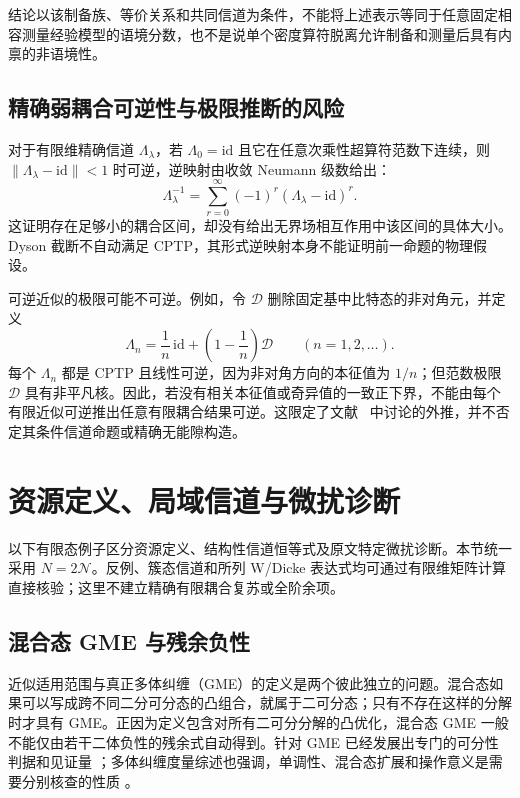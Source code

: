 \documentclass[UTF8,11pt,a4paper,fontset=none]{ctexart}
\begin{document}
结论以该制备族、等价关系和共同信道为条件，不能将上述表示等同于任意固定相容测量经验模型的语境分数，也不是说单个密度算符脱离允许制备和测量后具有内禀的非语境性。

\subsection{精确弱耦合可逆性与极限推断的风险}
对于有限维精确信道 $\Lambda_\lambda$，若 $\Lambda_0=\mathrm{id}$ 且它在任意次乘性超算符范数下连续，则 $\|\Lambda_\lambda-\mathrm{id}\|<1$ 时可逆，逆映射由收敛 Neumann 级数给出：
\begin{equation}
\Lambda_\lambda^{-1}=\sum_{r=0}^{\infty}
(-1)^r(\Lambda_\lambda-\mathrm{id})^r.
\label{eq:supp-neumann-channel-inverse}
\end{equation}
这证明存在足够小的耦合区间，却没有给出无界场相互作用中该区间的具体大小。Dyson 截断不自动满足 CPTP，其形式逆映射本身不能证明前一命题的物理假设。

可逆近似的极限可能不可逆。例如，令 $\mathcal D$ 删除固定基中比特态的非对角元，并定义
\begin{equation}
\Lambda_n=\frac1n\,\mathrm{id}+
\left(1-\frac1n\right)\mathcal D\qquad(n=1,2,\ldots).
\end{equation}
每个 $\Lambda_n$ 都是 CPTP 且线性可逆，因为非对角方向的本征值为 $1/n$；但范数极限 $\mathcal D$ 具有非平凡核。因此，若没有相关本征值或奇异值的一致正下界，不能由每个有限近似可逆推出任意有限耦合结果可逆。这限定了文献~\cite{CamposDelgadoIpek2026} 中讨论的外推，并不否定其条件信道命题或精确无能隙构造。



\section{资源定义、局域信道与微扰诊断}
\label{app:resource-diagnostics}

以下有限态例子区分资源定义、结构性信道恒等式及原文特定微扰诊断。本节统一采用 $N=2\mathcal N$。反例、簇态信道和所列 W/Dicke 表达式均可通过有限维矩阵计算直接核验；这里不建立精确有限耦合复苏或全阶余项。

\subsection{混合态 GME 与残余负性}

近似适用范围与真正多体纠缠（GME）的定义是两个彼此独立的问题。混合态如果可以写成跨不同二分可分态的凸组合，就属于二可分态；只有不存在这样的分解时才具有 GME。正因为定义包含对所有二可分分解的凸优化，混合态 GME 一般不能仅由若干二体负性的残余式自动得到。针对 GME 已经发展出专门的可分性判据和见证量 \cite{GuhneSeevinck2010}；多体纠缠度量综述也强调，单调性、混合态扩展和操作意义是需要分别核查的性质 \cite{MaLiShang2025}。
\end{document}
